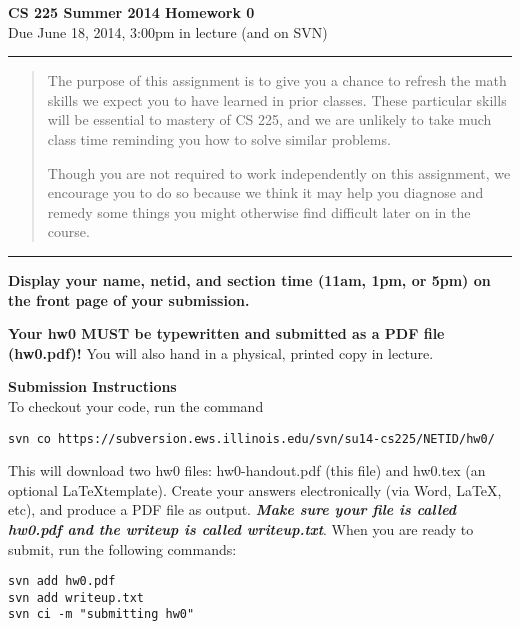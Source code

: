 \documentclass[12pt]{article}
\begin{document}

\thispagestyle{empty}

\begin{center}
\LARGE
\textbf{CS 225 Summer 2014 Homework 0}\\
\Large Due June 18, 2014, 3:00pm in lecture (and on SVN)
\end{center}

\bigskip
\hrule
\begin{quote}
The purpose of this assignment is to give you a chance to refresh the math
skills we expect you to have learned in prior classes.  These particular skills
will be essential to mastery of CS 225, and we are unlikely to take much class
time reminding you how to solve similar problems.

Though you are not required to work independently on this assignment, we
encourage you to do so because we think it may help you diagnose and remedy some
things you might otherwise find difficult later on in the course.
\end{quote}
\hrule
\bigskip

{\Large
    \vspace{1in}

    \textbf{Display your name, netid, and section time (11am, 1pm, or 5pm)
    on the front page of your submission.}

    \vspace{1in}

    \textbf{Your hw0 MUST be typewritten and submitted as a PDF file
    (hw0.pdf)!} You will also hand in a physical, printed copy in lecture.
}

\newpage

\textbf{Submission Instructions}\\

To checkout your code, run the command

\begin{verbatim}
svn co https://subversion.ews.illinois.edu/svn/su14-cs225/NETID/hw0/
\end{verbatim}

This will download two hw0 files: hw0-handout.pdf (this file) and hw0.tex (an
optional \LaTeX template). Create your answers electronically (via Word,
\LaTeX, etc), and produce a PDF file as output. \textbf{\emph{Make sure your
file is called hw0.pdf and the writeup is called writeup.txt}}. When you are
ready to submit, run the following commands:

\begin{verbatim}
svn add hw0.pdf
svn add writeup.txt
svn ci -m "submitting hw0"
\end{verbatim}
\end{document}
